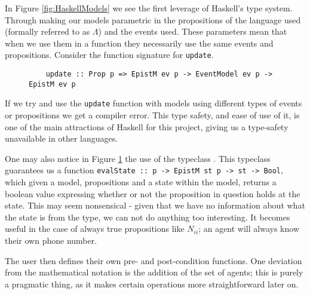 \documentclass[10pt, a4paper]{report}
\begin{document}
In Figure \ref{fig:HaskellModels} we see the first leverage of Haskell's type
system. Through making our models parametric in the propositions of the language
used (formally referred to as $\Lambda$) and the events used. These parameters
mean that when we use them in a function they necessarily use the same events
and propositions. Consider the function signature for \texttt{update}.

\begin{figure}[h]
  \centering
  \begin{verbatim}
    update :: Prop p => EpistM ev p -> EventModel ev p -> EpistM ev p
\end{verbatim}
  \caption{}
  \label{fig:UpdateType}
\end{figure}

If we try and use the \texttt{update} function with models using
different types of events or propositions we get a compiler error. This type
safety, and ease of use of it, is one of the main attractions of Haskell for
this project, giving us a type-safety unavailable in other languages. 

One may also notice in Figure \ref{fig:UpdateType} the use of the typeclass
. This typeclass guarantees us a function
\texttt{evalState :: p -> EpistM st p -> st -> Bool}, which given a
model, propositions and a state within the model, returns a boolean value
expressing whether or not the proposition in question holds at the state. This
may seem nonsensical - given that we have no information about what the state is
from the type, we can not do anything too interesting. It becomes useful in the
case of always true propositions like $N_{ii}$; an agent will always know
their own phone number.

The user then defines their own \textsf{pre}- and \textsf{post}-condition
functions. One deviation from the mathematical notation is the addition of the
set of agents; this is purely a pragmatic thing, as it makes certain operations
more straightforward later on.
\end{document}
